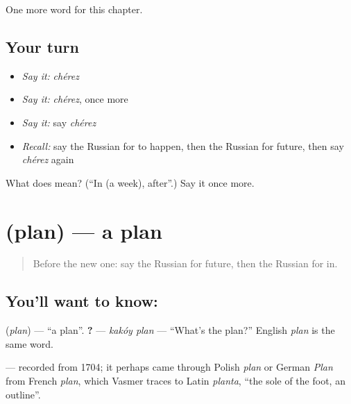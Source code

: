 \begin{grammarlens}[title={What you've built}]
One more word for this chapter.
\end{grammarlens}

\subsection*{Your turn}
\begin{itemize}
\raggedright
  \item \emph{Say it:} \emph{chérez}
  \item \emph{Say it:} \emph{chérez}, once more
  \item \emph{Say it:} say \emph{chérez}
  \item \emph{Recall:} say the Russian for to happen, then the Russian for future, then say \emph{chérez} again
\end{itemize}

\begin{tcolorbox}[breakable,colback=teal!4,colframe=teal!35!black,title={Before you move on}]
What does  mean? (\textquotedblleft{}In (a week), after\textquotedblright{}.) Say it once more.
\end{tcolorbox}
\section[\texorpdfstring{\ru{план} (plan)}{план (plan)}]{ (plan) — a plan}

\label{lesson:RU-C138-plan}



\begin{quote}
Before the new one: say the Russian for future, then the Russian for in.
\end{quote}

\subsection*{You'll want to know: }
\textbf{} (\emph{plan}) — \textquotedblleft{}a plan\textquotedblright{}. \textbf{ ?} — \emph{kakóy plan} — \textquotedblleft{}What's the plan?\textquotedblright{} English \emph{plan} is the same word.

\begin{cousinweb}
\textbf{} — recorded from 1704; it perhaps came through Polish \emph{plan} or German \emph{Plan} from French \emph{plan}, which Vasmer traces to Latin \emph{planta}, \textquotedblleft{}the sole of the foot, an outline\textquotedblright{}.
\end{cousinweb}

